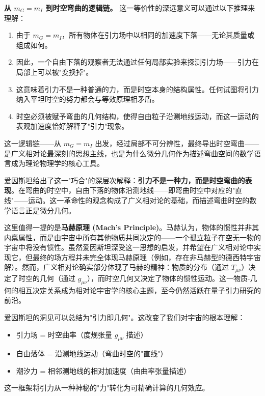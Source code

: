 \medskip

\textbf{从 $m_G=m_I$ 到时空弯曲的逻辑链。} 这一等价性的深远意义可以通过以下推理来理解：
\begin{enumerate}
    \item 由于 $m_G=m_I$，所有物体在引力场中以相同的加速度下落——无论其质量或组成如何。
    \item 因此，一个自由下落的观察者无法通过任何局部实验来探测引力场——引力在局部上可以被"变换掉"。
    \item 这意味着引力不是一种普通的力，而是时空本身的结构属性。任何试图将引力纳入平坦时空的努力都会与等效原理相矛盾。
    \item 时空必须被赋予弯曲的几何结构，使得自由粒子沿测地线运动，而这一运动的表观加速度恰好解释了"引力"现象。
\end{enumerate}
这一逻辑链——从 $m_G=m_I$ 出发，经过局部不可分辨性，最终导出时空弯曲——是广义相对论最深刻的思想主线，也是为什么微分几何作为描述弯曲空间的数学语言成为理论物理学的核心工具。

\medskip

爱因斯坦给出了这一"巧合"的深层次解释：\textbf{引力不是一种力，而是时空弯曲的表现}。在弯曲的时空中，自由下落的物体沿测地线——即弯曲时空中对应的"直线"——运动。这一革命性的观念构成了广义相对论的基础，而描述弯曲时空的数学语言正是微分几何。

\medskip

这里值得一提的是\textbf{马赫原理 (Mach's Principle)}。马赫认为，物体的惯性并非其内禀属性，而是由宇宙中所有其他物质共同决定的——一个孤立粒子在空无一物的宇宙中将没有惯性。虽然爱因斯坦深受这一思想的启发，并希望在广义相对论中实现它，但最终的场方程并未完全体现马赫原理（例如，存在非马赫型的德西特宇宙解）。然而，广义相对论确实部分体现了马赫的精神：物质的分布（通过 $T_{\mu\nu}$）决定了时空的几何（通过 $g_{\mu\nu}$），而时空几何又决定了物体的惯性运动。这一物质-几何的相互决定关系成为相对论宇宙学的核心主题，至今仍然活跃在量子引力研究的前沿。

\begin{note}
爱因斯坦的洞见可以总结为"引力即几何"。这改变了我们对宇宙的根本理解：
\begin{itemize}
    \item 引力场 = 时空曲率（度规张量 $g_{\mu\nu}$ 描述）
    \item 自由落体 = 沿测地线运动（弯曲时空的"直线"）
    \item 潮汐力 = 相邻测地线的相对加速度（由曲率张量描述）
\end{itemize}
这一框架将引力从一种神秘的"力"转化为可精确计算的几何效应。
\end{note}

